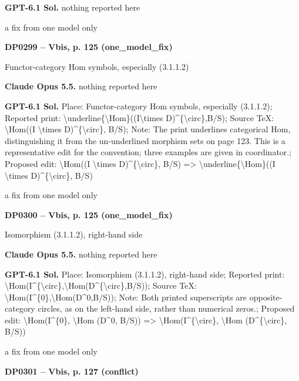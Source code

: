 \textbf{GPT-6.1 Sol.} nothing reported here\par
a fix from one model only\par
\par\noindent\hypertarget{DP0299}{}\textbf{DP0299 -- Vbis, p. 125 (one\_model\_fix)}\par
Functor-category Hom symbols, especially (3.1.1.2)\par
\textbf{Claude Opus 5.5.} nothing reported here\par
\textbf{GPT-6.1 Sol.} Place: Functor-category Hom symbols, especially (3.1.1.2); Reported print: \textbackslash{}underline\{\textbackslash{}Hom\}((I\textbackslash{}times D)\textasciicircum{}\{\textbackslash{}circ\},B/S); Source TeX: \textbackslash{}Hom((I \textbackslash{}times D)\textasciicircum{}\{\textbackslash{}circ\}, B/S); Note: The print underlines categorical Hom, distinguishing it from the un-underlined morphism sets on page 123. This is a representative edit for the convention; three examples are given in coordinator.; Proposed edit: \textbackslash{}Hom((I \textbackslash{}times D)\textasciicircum{}\{\textbackslash{}circ\}, B/S) =\allowbreak > \textbackslash{}underline\{\textbackslash{}Hom\}((I \textbackslash{}times D)\textasciicircum{}\{\textbackslash{}circ\}, B/S)\par
a fix from one model only\par
\par\noindent\hypertarget{DP0300}{}\textbf{DP0300 -- Vbis, p. 125 (one\_model\_fix)}\par
Isomorphism (3.1.1.2), right-hand side\par
\textbf{Claude Opus 5.5.} nothing reported here\par
\textbf{GPT-6.1 Sol.} Place: Isomorphism (3.1.1.2), right-hand side; Reported print: \textbackslash{}Hom(I\textasciicircum{}\{\textbackslash{}circ\},\textbackslash{}Hom(D\textasciicircum{}\{\textbackslash{}circ\},B/S)); Source TeX: \textbackslash{}Hom(I\textasciicircum{}\{0\},\textbackslash{}Hom(D\textasciicircum{}0,B/S)); Note: Both printed superscripts are opposite-category circles, as on the left-hand side, rather than numerical zeros.; Proposed edit: \textbackslash{}Hom(I\textasciicircum{}\{0\}, \textbackslash{}Hom (D\textasciicircum{}0, B/S)) =\allowbreak > \textbackslash{}Hom(I\textasciicircum{}\{\textbackslash{}circ\}, \textbackslash{}Hom (D\textasciicircum{}\{\textbackslash{}circ\}, B/S))\par
a fix from one model only\par
\par\noindent\hypertarget{DP0301}{}\textbf{DP0301 -- Vbis, p. 127 (conflict)}\par
